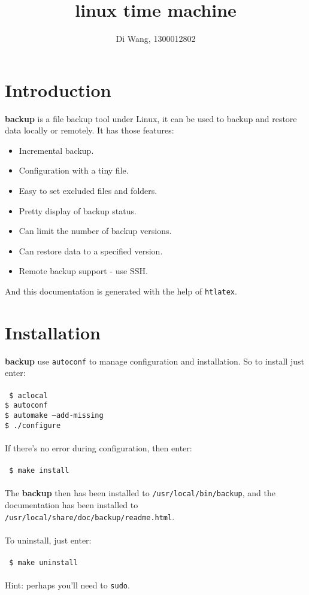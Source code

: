 \documentclass[a4paper]{article}
\author{Di Wang, 1300012802}
\begin{document}
\title{linux time machine}
\maketitle

\tableofcontents

\section{Introduction}
\textbf{backup} is a file backup tool under Linux, it can be used to backup and restore data locally or remotely. It has those features:
\begin{itemize}
    \item Incremental backup.
    \item Configuration with a tiny file.
    \item Easy to set excluded files and folders.
    \item Pretty display of backup status.
    \item Can limit the number of backup versions.
    \item Can restore data to a specified version.
    \item Remote backup support - use SSH.
\end{itemize}
And this documentation is generated with the help of {\large\tt htlatex}.

\section{Installation}
\textbf{backup} use {\large\tt autoconf} to manage configuration and installation. So to install just enter:\\
\\
{\tt
    \$ aclocal \\
    \$ autoconf \\
    \$ automake --add-missing \\
    \$ ./configure \\
}
\\
If there's no error during configuration, then enter:\\
\\
{\tt
    \$ make install \\
}
\\
The \textbf{backup} then has been installed to {\large\tt /usr/local/bin/backup}, and the documentation has been installed to {\large\tt /usr/local/share/doc/backup/readme.html}. \\
\\
To uninstall, just enter: \\
\\
{\tt
    \$ make uninstall \\
}
\\
Hint: perhaps you'll need to {\large\tt sudo}.
\end{document}
